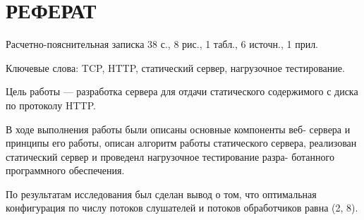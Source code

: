 \chapter*{РЕФЕРАТ}

Расчетно-пояснительная записка 38 с., 8 рис., 1 табл., 6 источн., 1 прил.

Ключевые слова: TCP, HTTP, статический сервер, нагрузочное тестирование.

Цель работы --- разработка сервера для отдачи статического содержимого
с диска по протоколу HTTP.

В ходе выполнения работы были описаны основные компоненты веб-
сервера и принципы его работы, описан алгоритм работы статического сервера,
реализован статический сервер и проведенл нагрузочное тестирование разра-
ботанного программного обеспечения.

По результатам исследования был сделан вывод о том, 
что оптимальная конфигурация по числу потоков слушателей и потоков обработчиков  равна (2, 8). 
